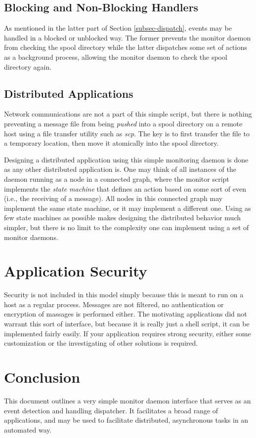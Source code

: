 \documentclass[11pt,twocolumn]{article}
\begin{document}
\subsection{Blocking and Non-Blocking Handlers}
\label{subsec-blocking}

As mentioned in the latter part of Section \ref{subsec-dispatch}, events may be handled in a blocked or unblocked way.  The former prevents the monitor daemon from checking the spool directory while the latter dispatches some set of actions as a background process, allowing the monitor daemon to check the spool directory again.

\subsection{Distributed Applications}
\label{subsec-distributed}

Network communications are not a part of this simple script, but there is nothing preventing a message file from being \textit{pushed} into a spool directory on a remote host using a file transfer utility such as \textit{scp}.  The key is to first transfer the file to a temporary location, then move it atomically into the spool directory.

Designing a distributed application using this simple monitoring daemon is done as any other distributed application is.  One may think of all instances of the daemon running as a node in a connected graph, where the monitor script implements the \textit{state machine} that defines an action based on some sort of even (i.e., the receiving of a message).  All nodes in this connected graph may implement the same state machine, or it may implement a different one.  Using as few state machines as possible makes designing the distributed behavior much simpler, but there is no limit to the complexity one can implement using a set of monitor daemons. 

\section{Application Security}
\label{sec-security}

Security is not included in this model simply because this is meant to run on a host as a regular process.  Messages are not filtered, no authentication or encryption of massages is performed either.  The motivating applications did not warrant this sort of interface, but because it is really just a shell script, it can be implemented fairly easily.  If your application requires strong security, either some customization or the investigating of other solutions is required. 

\section{Conclusion}
\label{sec-conclusion}

This document outlines a very simple monitor daemon interface that serves as an event detection and handling dispatcher.  It facilitates a broad range of applications, and may be used to facilitate distributed, asynchronous tasks in an automated way.



\end{document}
